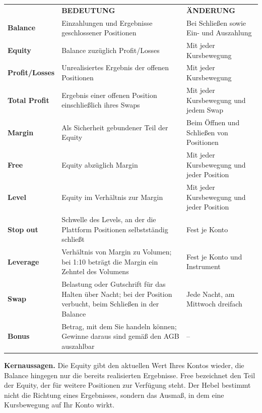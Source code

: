 \documentclass[10pt,a4paper]{article}
\newcommand{\micro}{\fontsize{7}{9}\selectfont}
\newcommand{\ls}{\addfontfeatures{LetterSpace=14}}
\newcommand{\hd}[1]{{\micro\bfseries\ls\color{soft}\MakeUppercase{#1}}}
\begin{document}
\begin{tabular}{@{}>{\raggedright\arraybackslash}p{28mm}>{\raggedright\arraybackslash}p{72mm}%
  >{\raggedright\arraybackslash}p{61.5mm}@{}}
\hd{Begriff} & \hd{Bedeutung} & \hd{Änderung} \\
\addlinespace[1.6mm]\midrule\addlinespace[2.4mm]
\textbf{Balance} & Einzahlungen und Ergebnisse geschlossener Positionen & Bei Schließen sowie Ein- und Auszahlung \\ \addlinespace[2mm]
\textbf{Equity} & Balance zuzüglich Profit/Losses & Mit jeder Kursbewegung \\ \addlinespace[2mm]
\textbf{Profit/Losses} & Unrealisiertes Ergebnis der offenen Positionen & Mit jeder Kursbewegung \\ \addlinespace[2mm]
\textbf{Total Profit} & Ergebnis einer offenen Position einschließlich ihres Swaps & Mit jeder Kursbewegung
  und jedem Swap \\ \addlinespace[2mm]
\textbf{Margin} & Als Sicherheit gebundener Teil der Equity & Beim Öffnen und Schließen von Positionen \\ \addlinespace[2mm]
\textbf{Free} & Equity abzüglich Margin & Mit jeder Kursbewegung und jeder Position \\ \addlinespace[2mm]
\textbf{Level} & Equity im Verhältnis zur Margin & Mit jeder Kursbewegung und jeder Position \\ \addlinespace[2mm]
\textbf{Stop out} & Schwelle des Levels, an der die Plattform Positionen selbstständig schließt & Fest je Konto \\ \addlinespace[2mm]
\textbf{Leverage} & Verhältnis von Margin zu Volumen; bei 1:10 beträgt die Margin ein Zehntel des Volumens
  & Fest je Konto und Instrument \\ \addlinespace[2mm]
\textbf{Swap} & Belastung oder Gutschrift für das Halten über Nacht; bei der Position verbucht, beim Schließen
  in der Balance & Jede Nacht, am Mittwoch dreifach \\ \addlinespace[2mm]
\textbf{Bonus} & Betrag, mit dem Sie handeln können; Gewinne daraus sind gemäß den AGB auszahlbar
  & – \\
\end{tabular}
\par\vspace{6mm}
\begin{merk}\textbf{Kernaussagen.} Die Equity gibt den aktuellen Wert Ihres Kontos wieder, die Balance hingegen nur
die bereits realisierten Ergebnisse. Free bezeichnet den Teil der Equity, der für weitere Positionen zur Verfügung
steht. Der Hebel bestimmt nicht die Richtung eines Ergebnisses, sondern das Ausmaß, in dem eine Kursbewegung
auf Ihr Konto wirkt.\end{merk}
\end{document}
